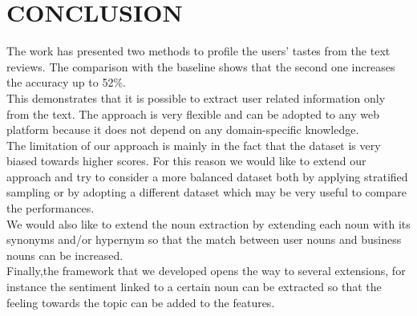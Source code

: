 \documentclass[a4paper, 10pt, conference]{ieeeconf}      %
\begin{document}
\section{CONCLUSION}
The work has presented two methods to profile the users' tastes from the text reviews. The comparison with the baseline shows that the second one increases the accuracy up to 52\%.\\
This demonstrates that it is possible to extract user related information only from the text. The approach is very flexible and can be adopted to any web platform because it does not depend on any domain-specific knowledge.\\
The limitation of our approach is mainly in the fact that the dataset is very biased towards higher scores. For this reason we would like to extend our approach and try to consider a more balanced dataset both by applying stratified sampling or by adopting a different dataset which may be very useful to compare the performances.\\
We would also like to extend the noun extraction by extending each noun with its synonyms and/or hypernym so that the match between user nouns and business nouns can be increased.\\
Finally,the framework that we developed opens the way to several extensions, for instance the sentiment linked to a certain noun can be extracted so that the feeling towards the topic can be added to the features.\\


\addtolength{\textheight}{-12cm}   %







\end{document}
